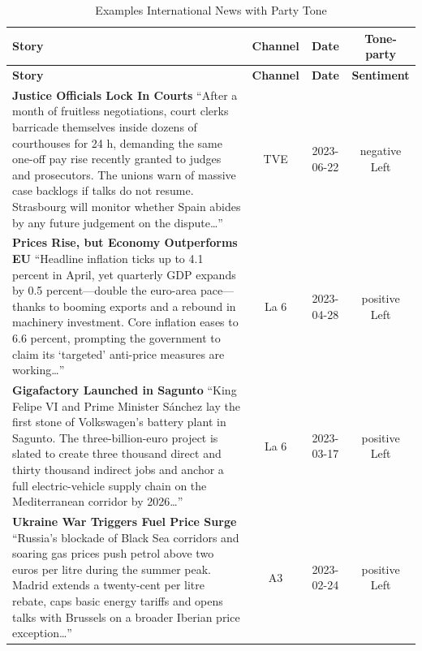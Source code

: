 \documentclass[12pt]{article}
\begin{document}
\begin{center}


\begin{longtable}{|p{8cm}|c|c|c|}
\caption{Examples International News with Party Tone}\\
	\hline
	\textbf{Story} & \textbf{Channel} & \textbf{Date} & \textbf{Tone-party} \\
	\hline
	\endfirsthead
	\hline
	\textbf{Story} & \textbf{Channel} & \textbf{Date} & \textbf{Sentiment} \\
	\hline
	\endhead
	
	\textbf{Justice Officials Lock In Courts}\newline
	{\scriptsize“After a month of fruitless negotiations, court clerks barricade themselves inside dozens of courthouses for 24 h, demanding the same one-off pay rise recently granted to judges and prosecutors.  The unions warn of massive case backlogs if talks do not resume.  Strasbourg will monitor whether Spain abides by any future judgement on the dispute…”}
	& TVE & 2023-06-22 & negative Left\\
	\hline
	
	\textbf{Prices Rise, but Economy Outperforms EU}\newline
	{\scriptsize“Headline inflation ticks up to 4.1 percent in April, yet quarterly GDP expands by 0.5 percent—double the euro-area pace—thanks to booming exports and a rebound in machinery investment.  Core inflation eases to 6.6 percent, prompting the government to claim its ‘targeted’ anti-price measures are working…”}
	& La 6 & 2023-04-28 & positive Left\\
	\hline
	
	\textbf{Gigafactory Launched in Sagunto}\newline
	{\scriptsize“King Felipe VI and Prime Minister Sánchez lay the first stone of Volkswagen’s battery plant in Sagunto.  The three-billion-euro project is slated to create three thousand direct and thirty thousand indirect jobs and anchor a full electric-vehicle supply chain on the Mediterranean corridor by 2026…”}
	& La 6 & 2023-03-17 & positive Left\\
	\hline
	
	\textbf{Ukraine War Triggers Fuel Price Surge}\newline
	{\scriptsize“Russia’s blockade of Black Sea corridors and soaring gas prices push petrol above two euros per litre during the summer peak.  Madrid extends a twenty-cent per litre rebate, caps basic energy tariffs and opens talks with Brussels on a broader Iberian price exception…”}
	& A3 & 2023-02-24 & positive Left\\
	\hline
	

\end{longtable}
\end{center}
\end{document}
